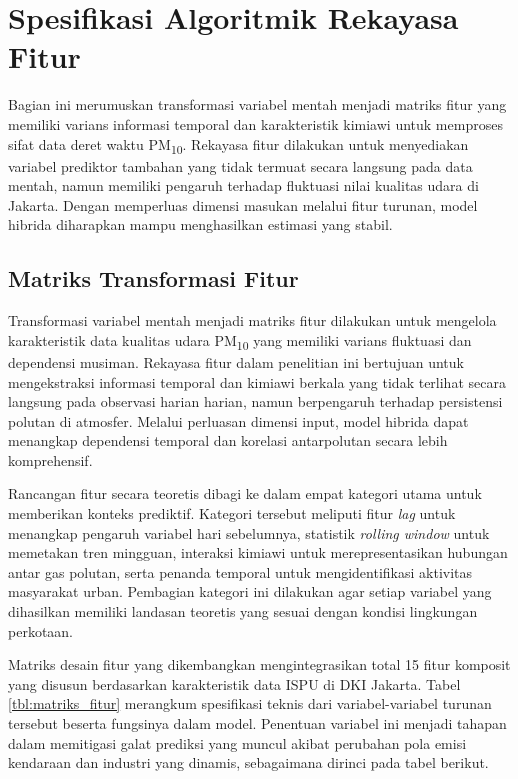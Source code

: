 \section{Spesifikasi Algoritmik Rekayasa Fitur}

Bagian ini merumuskan transformasi variabel mentah menjadi matriks fitur yang memiliki varians informasi temporal dan karakteristik kimiawi untuk memproses sifat data deret waktu PM\textsubscript{10}. Rekayasa fitur dilakukan untuk menyediakan variabel prediktor tambahan yang tidak termuat secara langsung pada data mentah, namun memiliki pengaruh terhadap fluktuasi nilai kualitas udara di Jakarta. Dengan memperluas dimensi masukan melalui fitur turunan, model hibrida diharapkan mampu menghasilkan estimasi yang stabil.

\subsection{Matriks Transformasi Fitur}

Transformasi variabel mentah menjadi matriks fitur dilakukan untuk mengelola karakteristik data kualitas udara PM\textsubscript{10} yang memiliki varians fluktuasi dan dependensi musiman. Rekayasa fitur dalam penelitian ini bertujuan untuk mengekstraksi informasi temporal dan kimiawi berkala yang tidak terlihat secara langsung pada observasi harian harian, namun berpengaruh terhadap persistensi polutan di atmosfer. Melalui perluasan dimensi input, model hibrida dapat menangkap dependensi temporal dan korelasi antarpolutan secara lebih komprehensif.

Rancangan fitur secara teoretis dibagi ke dalam empat kategori utama untuk memberikan konteks prediktif. Kategori tersebut meliputi fitur \textit{lag} untuk menangkap pengaruh variabel hari sebelumnya, statistik \textit{rolling window} untuk memetakan tren mingguan, interaksi kimiawi untuk merepresentasikan hubungan antar gas polutan, serta penanda temporal untuk mengidentifikasi aktivitas masyarakat urban. Pembagian kategori ini dilakukan agar setiap variabel yang dihasilkan memiliki landasan teoretis yang sesuai dengan kondisi lingkungan perkotaan.

\newpage

Matriks desain fitur yang dikembangkan mengintegrasikan total 15 fitur komposit yang disusun berdasarkan karakteristik data ISPU di DKI Jakarta. Tabel \ref{tbl:matriks_fitur} merangkum spesifikasi teknis dari variabel-variabel turunan tersebut beserta fungsinya dalam model. Penentuan variabel ini menjadi tahapan dalam memitigasi galat prediksi yang muncul akibat perubahan pola emisi kendaraan dan industri yang dinamis, sebagaimana dirinci pada tabel berikut.

